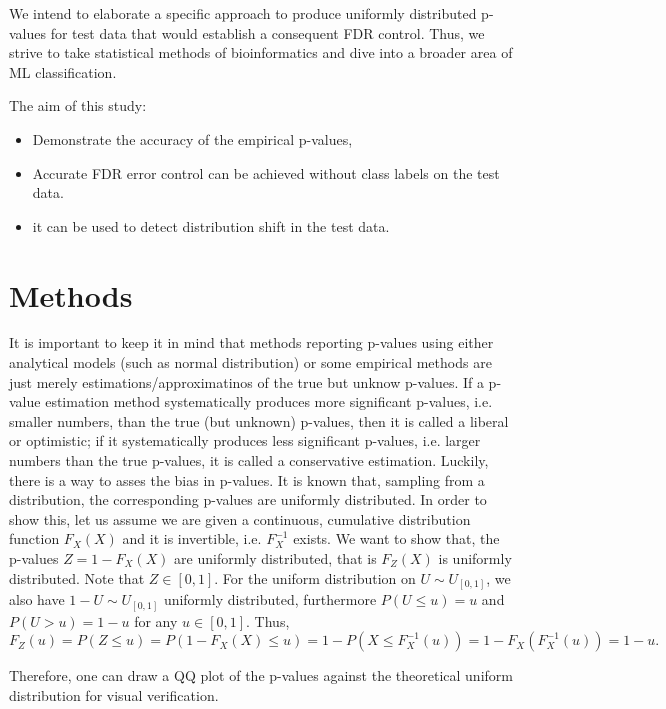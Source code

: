 \documentclass{article}
\begin{document}
We intend to elaborate a specific approach to produce uniformly distributed p-values for test data that would establish a consequent FDR control. Thus, we strive to take statistical methods of bioinformatics and dive into a broader area of ML classification.

The aim of this study:
\begin{itemize}
	\item Demonstrate the accuracy of the empirical p-values,
	\item Accurate FDR error control can be achieved without class labels on the test data.
	\item it can be used to detect distribution shift in the test data. 
\end{itemize}

\section{Methods}

It is important to keep it in mind that methods reporting p-values using either analytical models (such as normal distribution) or some empirical methods are just merely estimations/approximatinos of the true but unknow p-values. If a p-value estimation method systematically produces more significant p-values, i.e. smaller numbers, than the true (but unknown) p-values, then it is called a liberal or optimistic; if it systematically produces less significant p-values, i.e. larger numbers than the true p-values, it is called a conservative estimation. Luckily, there is a way to asses the bias in p-values. It is known that, sampling from a distribution, the corresponding p-values are uniformly distributed. In order to show this, let us assume we are given a continuous, cumulative distribution function $F_X(X)$ and it is invertible, i.e. $F_X^{-1}$ exists. We want to show that, the p-values $Z = 1-F_X(X)$ are uniformly distributed, that is $F_Z(X)$ is uniformly distributed. Note that $Z\in [0,1]$. For the uniform distribution on $U\sim U_{[0,1]}$, we also have $1-U\sim U_{[0,1]}$ uniformly distributed, furthermore $P(U\le u)=u$ and $P(U>u) = 1-u$ for any $u\in[0,1]$. Thus,
\begin{equation}
	F_Z(u)=P(Z \le u) = P(1-F_X(X)\le u)= 1-P(X\le F_X^{-1}(u))=1-F_X(F_X^{-1}(u))=1-u.
\end{equation}

Therefore, one can draw a QQ plot of the p-values against the theoretical uniform distribution for visual verification.
\end{document}
